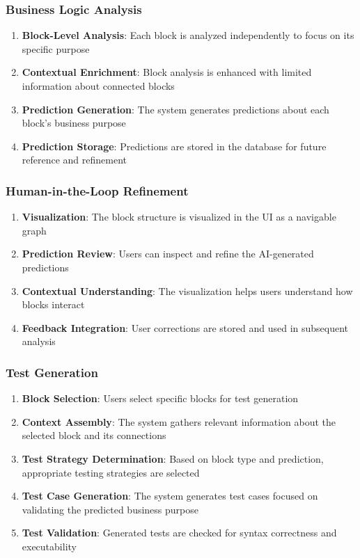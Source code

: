 \subsubsection{Business Logic Analysis}

\begin{enumerate}
    \item \textbf{Block-Level Analysis}: Each block is analyzed independently to focus on its specific purpose
    \item \textbf{Contextual Enrichment}: Block analysis is enhanced with limited information about connected blocks
    \item \textbf{Prediction Generation}: The system generates predictions about each block's business purpose
    \item \textbf{Prediction Storage}: Predictions are stored in the database for future reference and refinement
\end{enumerate}

\subsubsection{Human-in-the-Loop Refinement}

\begin{enumerate}
    \item \textbf{Visualization}: The block structure is visualized in the UI as a navigable graph
    \item \textbf{Prediction Review}: Users can inspect and refine the AI-generated predictions
    \item \textbf{Contextual Understanding}: The visualization helps users understand how blocks interact
    \item \textbf{Feedback Integration}: User corrections are stored and used in subsequent analysis
\end{enumerate}

\subsubsection{Test Generation}

\begin{enumerate}
    \item \textbf{Block Selection}: Users select specific blocks for test generation
    \item \textbf{Context Assembly}: The system gathers relevant information about the selected block and its connections
    \item \textbf{Test Strategy Determination}: Based on block type and prediction, appropriate testing strategies are selected
    \item \textbf{Test Case Generation}: The system generates test cases focused on validating the predicted business purpose
    \item \textbf{Test Validation}: Generated tests are checked for syntax correctness and executability
\end{enumerate}

